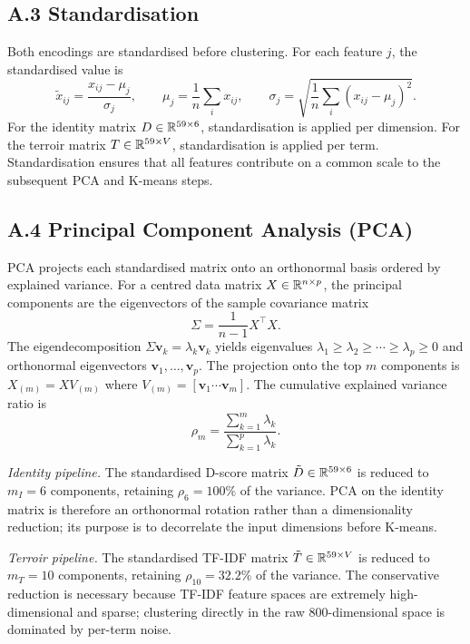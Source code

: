 \documentclass[11pt]{article}
\begin{document}
\subsection*{A.3 Standardisation}
Both encodings are standardised before clustering. For each feature $j$, the standardised value is
\[
\tilde{x}_{ij} = \frac{x_{ij} - \mu_j}{\sigma_j}, \qquad \mu_j = \frac{1}{n} \sum_i x_{ij}, \qquad \sigma_j = \sqrt{\frac{1}{n} \sum_i (x_{ij} - \mu_j)^2}.
\]
For the identity matrix $D \in \mathbb{R}^{59 \times 6}$, standardisation is applied per dimension. For the terroir matrix $T \in \mathbb{R}^{59 \times V}$, standardisation is applied per term. Standardisation ensures that all features contribute on a common scale to the subsequent PCA and K-means steps.

\subsection*{A.4 Principal Component Analysis (PCA)}
PCA projects each standardised matrix onto an orthonormal basis ordered by explained variance. For a centred data matrix $X \in \mathbb{R}^{n \times p}$, the principal components are the eigenvectors of the sample covariance matrix
\[
\Sigma = \frac{1}{n-1} X^\top X.
\]
The eigendecomposition $\Sigma \mathbf{v}_k = \lambda_k \mathbf{v}_k$ yields eigenvalues $\lambda_1 \geq \lambda_2 \geq \cdots \geq \lambda_p \geq 0$ and orthonormal eigenvectors $\mathbf{v}_1, \ldots, \mathbf{v}_p$. The projection onto the top $m$ components is $X_{(m)} = X V_{(m)}$ where $V_{(m)} = [\mathbf{v}_1 \cdots \mathbf{v}_m]$. The cumulative explained variance ratio is
\[
\rho_m = \frac{\sum_{k=1}^{m} \lambda_k}{\sum_{k=1}^{p} \lambda_k}.
\]

\textit{Identity pipeline.} The standardised D-score matrix $\tilde{D} \in \mathbb{R}^{59 \times 6}$ is reduced to $m_I = 6$ components, retaining $\rho_6 = 100\%$ of the variance. PCA on the identity matrix is therefore an orthonormal rotation rather than a dimensionality reduction; its purpose is to decorrelate the input dimensions before K-means.

\textit{Terroir pipeline.} The standardised TF-IDF matrix $\tilde{T} \in \mathbb{R}^{59 \times V}$ is reduced to $m_T = 10$ components, retaining $\rho_{10} = 32.2\%$ of the variance. The conservative reduction is necessary because TF-IDF feature spaces are extremely high-dimensional and sparse; clustering directly in the raw 800-dimensional space is dominated by per-term noise.
\end{document}
